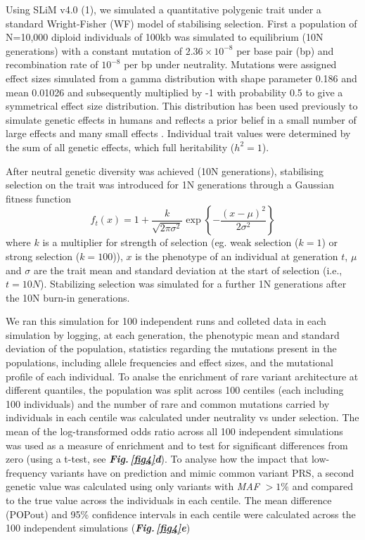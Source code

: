 \documentclass[12pt]{zHenriquesLab-StyleBioRxiv}
\newcommand\dref[2]{\normalsize{\textbf{\textit{Fig.\,\ref{#1}#2}}}\normalsize{}}
\begin{document}
Using SLiM v4.0 (1), we simulated a quantitative polygenic trait under
a standard Wright-Fisher (WF) model of stabilising selection. First a
population of N=10,000 diploid individuals of 100kb was simulated to
equilibrium (10N generations) with a constant mutation of
$2.36\times 10^{-8}$ per base pair (bp) and recombination rate of
$10^{-8}$ per bp under neutrality. Mutations were assigned effect
sizes simulated from a gamma distribution with shape parameter 0.186
and mean 0.01026 and subsequently multiplied by -1 with probability
0.5 to give a symmetrical effect size distribution. This distribution
has been used previously to simulate genetic effects in humans and
reflects a prior belief in a small number of large effects and many
small effects \cite{anil3}. Individual trait values were determined by
the sum of all genetic effects, which full heritability ($h^2 =1$).

After neutral genetic diversity was achieved (10N generations),
stabilising selection on the trait was introduced for 1N
generations through a Gaussian fitness function
\begin{equation} 
  f_t(x) = 1 + \frac{k}{\sqrt{2\pi\sigma^2}} \exp\left\{-\frac{(x-\mu)^2}{2\sigma^2}\right\}
\end{equation}
where $k$ is a multiplier for strength of selection (eg. weak selection ($k=1$) or 
strong selection ($k=100$)),
$x$ is the phenotype of an individual at generation $t$, $\mu$
and $\sigma$ are the trait mean and standard deviation at the start of
selection (i.e., $t=10N$). Stabilizing selection was simulated for a
further 1N generations after the 10N burn-in generations.

We ran this simulation for 100 independent runs and colleted data in 
each simulation by logging, at each generation, the phenotypic mean and standard 
deviation of the population, statistics regarding the mutations present in the 
populations, including allele frequencies and effect sizes, and the mutational profile of each individual. 
To analse the enrichment of rare variant architecture at different quantiles, the population 
was split across 100 centiles (each including 100 individuals) and the number of rare and common 
mutations carried by individuals in each centile was calculated under neutrality vs under selection.  
The mean of the log-transformed odds ratio across all 100 independent simulations was used as a measure 
of enrichment and to test for significant differences from zero (using a t-test, see \dref{fig4}{d}).  
To analyse how the impact that low-frequency variants have on prediction and mimic common 
variant PRS, a second genetic value was calculated using only variants with \emph{MAF} $>1\%$ 
and compared to the true value across the individuals in each centile.  The mean difference (POPout) 
and 95\% confidence intervals in each centile were calculated across the 100 independent simulations (\dref{fig4}{e}) 
\end{document}

